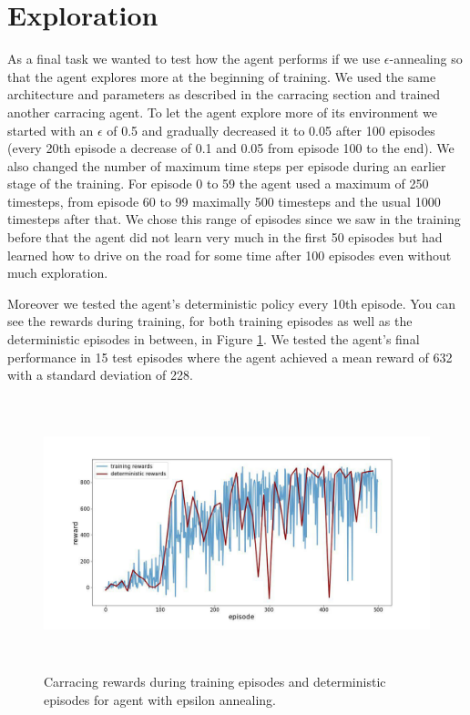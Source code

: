 \documentclass[a4paper,12pt]{article}
\begin{document}
\section{Exploration}

As a final task we wanted to test how the agent performs if we use $\epsilon$-annealing so that the agent explores more at the beginning of training. We used the same architecture and parameters as described in the carracing section and trained another carracing agent. To let the agent explore more of its environment we started with an $\epsilon$ of 0.5 and gradually decreased it to 0.05 after 100 episodes (every 20th episode a decrease of 0.1 and 0.05 from episode 100 to the end). We also changed the number of maximum time steps per episode during an earlier stage of the training. For episode 0 to 59 the agent used a maximum of 250 timesteps, from episode 60 to 99 maximally 500 timesteps and the usual 1000 timesteps after that.  We chose this range of episodes since we saw in the training before that the agent did not learn very much in the first 50 episodes but had learned how to drive on the road for some time after 100 episodes even without much exploration. 

Moreover we tested the agent's deterministic policy every 10th episode. You can see the rewards during training, for both training episodes as well as the deterministic episodes in between, in Figure \ref{fig:carracing_eps_agent}. We tested the agent's final performance in 15 test episodes where the agent achieved a mean reward of 632 with a standard deviation of 228. 

\begin{figure}[H]
	\centering \includegraphics[width=15.5cm, height=7.9cm]{plots/eps_annealing_agent_rewards.jpg}
	\caption{
		\label{fig:carracing_eps_agent}
		Carracing rewards during training episodes and deterministic episodes for agent with epsilon annealing.
	}
\end{figure}
\end{document}
